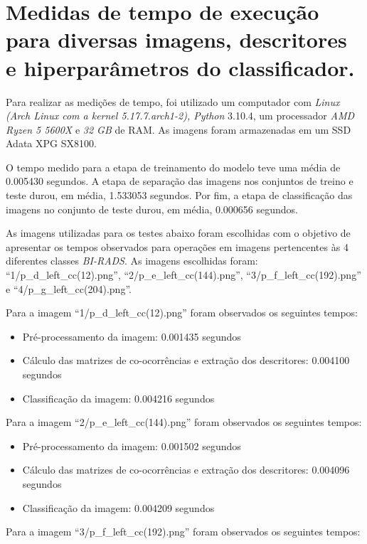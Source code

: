 \section{Medidas de tempo de execução para diversas imagens, descritores e hiperparâmetros do
classificador.}


Para realizar as medições de tempo, foi utilizado um computador com \emph{Linux
(Arch Linux com a kernel 5.17.7.arch1-2), Python} 3.10.4, um processador \emph{AMD Ryzen 5 
5600X} e \emph{32 GB} de RAM. As imagens foram armazenadas em um SSD Adata XPG SX8100.

O tempo medido para a etapa de treinamento do modelo teve uma média de 0.005430 segundos.  
A etapa de separação das imagens nos conjuntos de treino e teste durou, em média, 1.533053 
segundos. Por fim, a etapa de classificação das imagens no conjunto de teste durou, em média, 0.000656 segundos.

As imagens utilizadas para os testes abaixo foram escolhidas com o objetivo de apresentar 
os tempos observados para operações em imagens pertencentes às 4 diferentes classes \emph{BI-RADS}. 
As imagens escolhidas foram: “1/p\_d\_left\_cc(12).png”, “2/p\_e\_left\_cc(144).png”, 
“3/p\_f\_left\_cc(192).png” e “4/p\_g\_left\_cc(204).png”.

\noindent
Para a imagem “1/p\_d\_left\_cc(12).png” foram observados os seguintes tempos:

\begin{itemize}
    \item Pré-processamento da imagem: 0.001435 segundos
    \item Cálculo das matrizes de co-ocorrências e extração dos descritores: 0.004100 segundos
    \item Classificação da imagem: 0.004216 segundos
\end{itemize}


\noindent
Para a imagem “2/p\_e\_left\_cc(144).png” foram observados os seguintes tempos:

\begin{itemize}
    \item Pré-processamento da imagem: 0.001502 segundos
    \item Cálculo das matrizes de co-ocorrências e extração dos descritores: 0.004096 segundos
    \item Classificação da imagem: 0.004209 segundos
\end{itemize}


\noindent
Para a imagem “3/p\_f\_left\_cc(192).png” foram observados os seguintes tempos:

